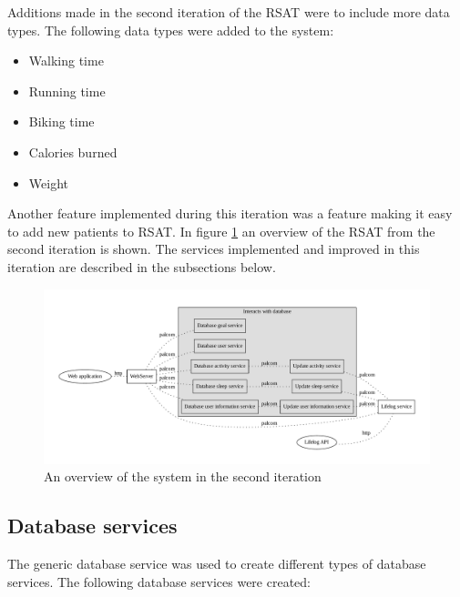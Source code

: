\documentclass{cslthse-msc}
\begin{document}
Additions made in the second iteration of the RSAT were to include more data types. The following data types were added to the system: 

\begin{itemize}
	\item Walking time
	\item Running time
	\item Biking time
	\item Calories burned
	\item Weight
\end{itemize}

Another feature implemented during this iteration was a feature making it easy to add new patients to RSAT. In figure \ref{fig:second-itr} an overview of the RSAT from the second iteration is shown. The services implemented and improved in this iteration are described in the subsections below. 

\begin{figure}[!hbt]
\centering
\includegraphics[scale=0.4]{forth-version.pdf} 
\caption{An overview of the system in the second iteration}\label{fig:second-itr}
\end{figure}


\subsection{Database services}

The generic database service was used to create different types of database services. The following database services were created: 
\end{document}
